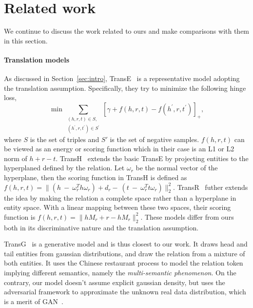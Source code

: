 \documentclass[twocolumn,a4paper,10pt,preprint,3p]{elsarticle}
\begin{document}

\section{Related work}

We continue to discuss the work related to ours and make comparisons with them in this section.

\paragraph{Translation models} As discussed in Section~\ref{sec:intro}, TransE~\cite{TransE2013} is a representative model adopting the translation assumption. Specifically, they try to minimize the following hinge loss,
\begin{equation}
    \min\sum_{\substack{(h, r, t)\in S,\\ (h^\prime, r, t^\prime)\in S^\prime }}
        {\left[\gamma + f(h, r, t) - f(h^\prime, r, t^\prime)\right]}_+, \label{eq:TransE}
\end{equation}
where $S$ is the set of triples and $S'$ is the set of negative samples. $f(h, r, t)$ can be viewed as an energy or scoring function which in their case is an L1 or L2 norm of $h + r - t$. TransH~\cite{TransH2014} extends the basic TransE by projecting entities to the hyperplaned defined by the relation. Let $\omega_r$ be the normal vector of the hyperplane, then the scoring function in TransH is defined as $f(h, r, t) = \lVert(h~-~\omega_r^T h \omega_r) + d_r -~(t~-~\omega_r^T t \omega_r)\rVert_2^2 $.
TransR~\cite{TransR2015} futher extends the idea by making the relation a complete space rather than a hyperplane in entity space. With a linear mapping between these two spaces, their scoring function is $f(h, r, t) = \lVert hM_r + r - h M_r \rVert_2^2$. These models differ from ours both in its discriminative nature and the translation assumption.

TransG~\cite{TransG} is a generative model and is thus closest to our work. It draws head and tail entities from gaussian distributions, and draw the relation from a mixture of both entities. It uses the Chinese restaurant process to model the relation token implying different semantics, namely the \emph{multi-semantic phenomenon}.
On the contrary, our model doesn't assume explicit gaussian density, but uses the adversarial framework to approximate the unknown real data distribution, which is a merit of GAN~\cite{Goodfellow_2016}.
\end{document}
